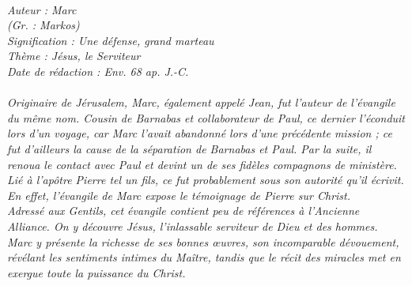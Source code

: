 \BFont
\noindent\hrulefill
{\footnotesize
\textit{
\bigskip
{\centering{}
\\Auteur : Marc
\\(Gr. : Markos)
\\Signification : Une défense, grand marteau
\\Thème : Jésus, le Serviteur
\\Date de rédaction : Env. 68 ap. J.-C.\\}
}
\textit{
\\Originaire de Jérusalem, Marc, également appelé Jean, fut l'auteur de l'évangile du même nom. Cousin de Barnabas et collaborateur de Paul, ce dernier l'éconduit lors d'un voyage, car Marc l'avait abandonné lors d'une précédente mission ; ce fut d'ailleurs la cause de la séparation de Barnabas et Paul. Par la suite, il renoua le contact avec Paul et devint un de ses fidèles compagnons de ministère. Lié à l'apôtre Pierre tel un fils, ce fut probablement sous son autorité qu'il écrivit. En effet, l'évangile de Marc expose le témoignage de Pierre sur Christ.
\\Adressé aux Gentils, cet évangile contient peu de références à l'Ancienne Alliance. On y découvre Jésus, l'inlassable
serviteur de Dieu et des hommes. Marc y présente la richesse de ses bonnes œuvres, son incomparable dévouement, révélant les sentiments intimes du Maître, tandis que le récit des miracles met en exergue toute la puissance du Christ.\bigskip
}
}
\par\nobreak\noindent\hrulefill
